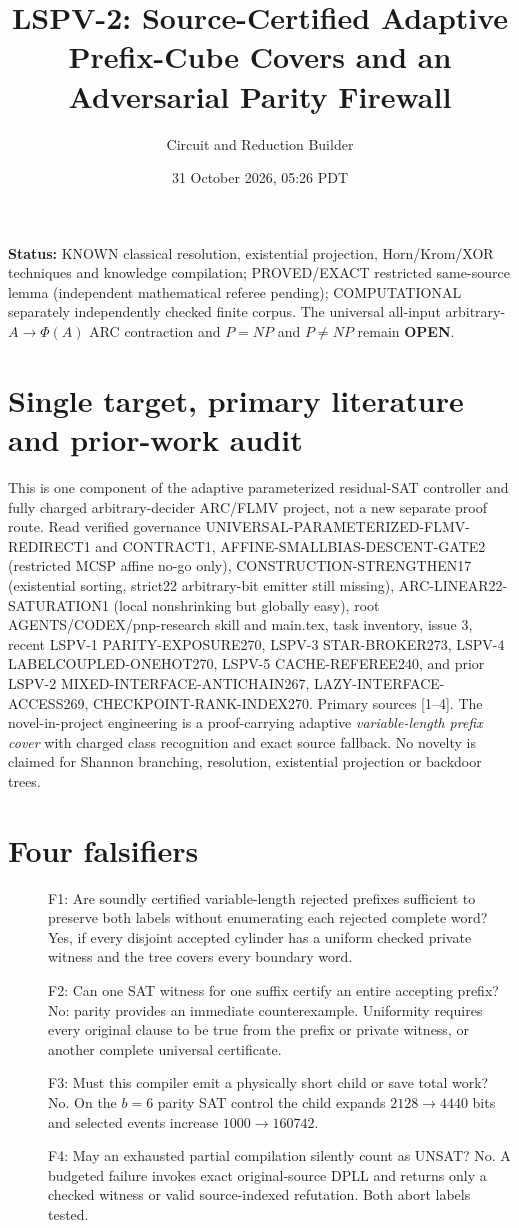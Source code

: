\documentclass[11pt]{article}
\title{LSPV-2: Source-Certified Adaptive Prefix-Cube Covers and an Adversarial Parity Firewall}
\author{Circuit and Reduction Builder}\date{31 October 2026, 05:26 PDT}
\begin{document}
\maketitle
\noindent\textbf{Status:} KNOWN classical resolution, existential projection, Horn/Krom/XOR techniques and knowledge compilation; PROVED/EXACT restricted same-source lemma (independent mathematical referee pending); COMPUTATIONAL separately independently checked finite corpus. The universal all-input arbitrary-$A\to\Phi(A)$ ARC contraction and $P=NP$ and $P\ne NP$ remain \textbf{OPEN}.

\section{Single target, primary literature and prior-work audit}
This is one component of the adaptive parameterized residual-SAT controller and fully charged arbitrary-decider ARC/FLMV project, not a new separate proof route. Read verified governance UNIVERSAL-PARAMETERIZED-FLMV-REDIRECT1 and CONTRACT1, AFFINE-SMALLBIAS-DESCENT-GATE2 (restricted MCSP affine no-go only), CONSTRUCTION-STRENGTHEN17 (existential sorting, strict22 arbitrary-bit emitter still missing), ARC-LINEAR22-SATURATION1 (local nonshrinking but globally easy), root AGENTS/CODEX/pnp-research skill and main.tex, task inventory, issue 3, recent LSPV-1 PARITY-EXPOSURE270, LSPV-3 STAR-BROKER273, LSPV-4 LABELCOUPLED-ONEHOT270, LSPV-5 CACHE-REFEREE240, and prior LSPV-2 MIXED-INTERFACE-ANTICHAIN267, LAZY-INTERFACE-ACCESS269, CHECKPOINT-RANK-INDEX270. Primary sources [1--4]. The novel-in-project engineering is a proof-carrying adaptive \emph{variable-length prefix cover} with charged class recognition and exact source fallback. No novelty is claimed for Shannon branching, resolution, existential projection or backdoor trees.

\section{Four falsifiers}
\begin{description}
\item[] F1: Are soundly certified variable-length rejected prefixes sufficient to preserve both labels without enumerating each rejected complete word? Yes, if every disjoint accepted cylinder has a uniform checked private witness and the tree covers every boundary word.
\item[] F2: Can one SAT witness for one suffix certify an entire accepting prefix? No: parity provides an immediate counterexample. Uniformity requires every original clause to be true from the prefix or private witness, or another complete universal certificate.
\item[] F3: Must this compiler emit a physically short child or save total work? No. On the $b=6$ parity SAT control the child expands $2128\to4440$ bits and selected events increase $1000\to160742$.
\item[] F4: May an exhausted partial compilation silently count as UNSAT? No. A budgeted failure invokes exact original-source DPLL and returns only a checked witness or valid source-indexed refutation. Both abort labels tested.
\end{description}
\end{document}
